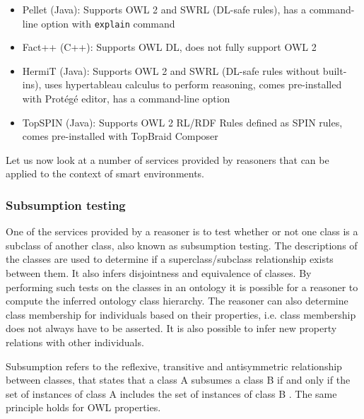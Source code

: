 \begin{itemize}
	\item Pellet (Java): Supports \ac{OWL} 2 and \ac{SWRL} (DL-safe rules), has a command-line option with \texttt{explain} command
 	\item Fact++ (C++): Supports \ac{OWL} DL, does not fully support \ac{OWL} 2
	\item HermiT (Java): Supports \ac{OWL} 2 and \ac{SWRL} (DL-safe rules without built-ins), uses hypertableau calculus to perform reasoning, comes pre-installed with Prot\'eg\'e editor, has a command-line option
	\item TopSPIN (Java): Supports \ac{OWL} 2 RL/RDF Rules defined as \ac{SPIN} rules, comes pre-installed with TopBraid Composer
\end{itemize}



Let us now look at a number of services provided by reasoners that can be applied to the context of smart environments.

\subsubsection{Subsumption testing}

One of the services provided by a reasoner is to test whether or not one class is a subclass of another class, also known as subsumption testing. The descriptions of the classes are used to determine if a superclass/subclass relationship exists between them. It also infers disjointness and equivalence of classes. By performing such tests on the classes in an ontology it is possible for a reasoner to compute the inferred ontology class hierarchy. The reasoner can also determine class membership for individuals based on their properties, i.e. class membership does not always have to be asserted. It is also possible to infer new property relations with other individuals.

Subsumption refers to the reflexive, transitive and antisymmetric relationship between classes, that states that a class A subsumes a class B if and only if the set of instances of class A includes the set of instances of class B \cite{Preuveneers2008}. The same principle holds for \ac{OWL} properties.

